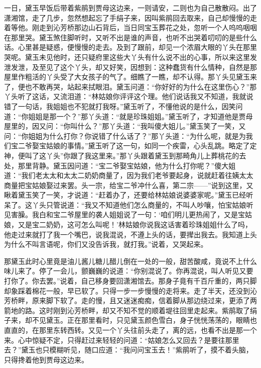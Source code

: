 \begin{parag}
    一日，黛玉早饭后带着紫鹃到贾母这边来，一则请安，二则也为自己散散闷。出了潇湘馆，走了几步，忽然想起忘了手绢子来，因叫紫鹃回去取来，自己却慢慢的走着等他。刚走到沁芳桥那边山石背后，当日同宝玉葬花之处，忽听一个人呜呜咽咽在那里哭。黛玉煞住脚听时，又听不出是谁的声音，也听不出哭着叨叨的是些什么话。心里甚是疑惑，便慢慢的走去。及到了跟前，却见一个浓眉大眼的丫头在那里哭呢。黛玉未见他时，还只疑府里这些大丫头有什么说不出的心事，所以来这里发泄发泄，及至见了这个丫头，却又好笑，因想到：这种蠢货有什么情种，自然是那屋里作粗活的丫头受了大女孩子的气了。细瞧了一瞧，却不认得。那丫头见黛玉来了，便也不敢再哭，站起来拭眼泪。黛玉问道：“你好好的为什么在这里伤心？”那丫头听了这话，又流泪道：“林姑娘你评评这个理。他们说话我又不知道，我就说错了一句话，我姐姐也不犯就打我呀。”黛玉听了，不懂他说的是什么，因笑问道：“你姐姐是那一个？”那丫头道：“就是珍珠姐姐。”黛玉听了，才知道他是贾母屋里的，因又问：“你叫什么？”那丫头道：“我叫傻大姐儿。”黛玉笑了一笑，又问：“你姐姐为什么打你？你说错了什么话了？”那丫头道：“为什么呢，就是为我们宝二爷娶宝姑娘的事情。”黛玉听了这一句，如同一个疾雷，心头乱跳。略定了定神，便叫了这丫头”你跟了我这里来。”那丫头跟着黛玉到那畸角儿上葬桃花的去处，那里背静。黛玉因问道：“宝二爷娶宝姑娘，他为什么打你呢？”傻大姐道：“我们老太太和太太二奶奶商量了，因为我们老爷要起身，说就赶着往姨太太商量把宝姑娘娶过来罢。头一宗，给宝二爷冲什么喜，第二宗——”说到这里，又瞅着黛玉笑了一笑，才说道：“赶着办了，还要给林姑娘说婆婆家呢。”黛玉已经听呆了。这丫头只管说道：“我又不知道他们怎么商量的，不叫人吵嚷，怕宝姑娘听见害臊。我白和宝二爷屋里的袭人姐姐说了一句：‘咱们明儿更热闹了，又是宝姑娘，又是宝二奶奶，这可怎么叫呢！’林姑娘你说我这话害着珍珠姐姐什么了吗，他走过来就打了我一个嘴巴，说我混说，不遵上头的话，要撵出我去。我知道上头为什么不叫言语呢，你们又没告诉我，就打我。”说着，又哭起来。
\end{parag}


\begin{parag}
    那黛玉此时心里竟是油儿酱儿糖儿醋儿倒在一处的一般，甜苦酸咸，竟说不上什么味儿来了。停了一会儿，颤巍巍的说道：“你别混说了。你再混说，叫人听见又要打你了。你去罢。”说着，自己移身要回潇湘馆去。那身子竟有千百斤重的，两只脚却象踩着棉花一般，早已软了。只得一步一步慢慢的走将来。走了半天，还没到沁芳桥畔，原来脚下软了。走的慢，且又迷迷痴痴，信着脚从那边绕过来，更添了两箭地的路。这时刚到沁芳桥畔，却又不知不觉的顺着堤往回里走起来。紫鹃取了绢子来，却不见黛玉。正在那里看时，只见黛玉颜色雪白，身子恍恍荡荡的，眼睛也直直的，在那里东转西转。又见一个丫头往前头走了，离的远，也看不出是那一个来。心中惊疑不定，只得赶过来轻轻的问道：“姑娘怎么又回去？是要往那里去？”黛玉也只模糊听见，随口应道：“我问问宝玉去！”紫鹃听了，摸不着头脑，只得搀着他到贾母这边来。
\end{parag}


